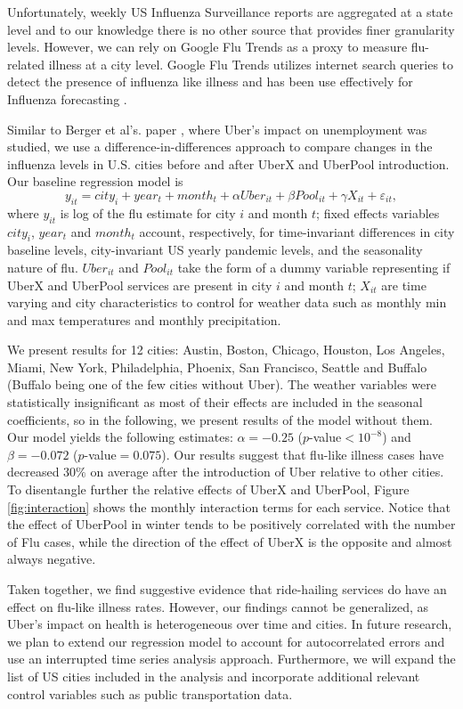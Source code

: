 \documentclass[a4paper,12pt]{article}
\begin{document}
Unfortunately, weekly US Influenza Surveillance reports are aggregated at a state level and to our knowledge there is no other source that provides finer granularity levels. However, we can rely on Google Flu Trends as a proxy to measure flu-related illness at a city level. Google Flu Trends utilizes internet search queries to detect the presence of influenza like illness and has been use effectively for Influenza forecasting \cite{yang2015accurate}.

Similar to Berger et al's. paper \cite{berger2017drivers}, where Uber's impact on unemployment was studied, we use a difference-in-differences approach to compare changes in the influenza levels in U.S. cities before and after UberX and UberPool introduction. Our baseline regression model is
\[
y_{it}=city_{i}+year_{t}+month_{t}+\alpha Uber_{it}+\beta Pool_{it}+\gamma X_{it}+ \varepsilon_{it},
\]
where $y_{it}$ is log of the flu estimate for city $i$ and month $t$; fixed effects variables $city_{i}$, $year_{t}$ and $month_{t}$ account, respectively, for time-invariant differences in city baseline levels, city-invariant US yearly pandemic levels, and the seasonality nature of flu. $Uber_{it}$ and $ Pool_{it}$ take the form of a dummy variable representing if UberX and UberPool services are present in city $i$ and month $t$; $X_{it}$ are time varying and city characteristics to control for weather data such as monthly min and max temperatures and monthly precipitation.

We present results for 12 cities: Austin, Boston, Chicago, Houston, Los Angeles, Miami, New York, Philadelphia, Phoenix,  San Francisco, Seattle and Buffalo (Buffalo being one of the few cities without Uber). The weather variables were statistically insignificant as most of their effects are included in the seasonal coefficients, so in the following, we present results of the model without them.
Our model yields the following estimates:  $\alpha =-0.25$ ($p$-value$<10^{-8}$) and $\beta =-0.072$ ($p$-value$=0.075$). Our results suggest that flu-like illness cases have decreased $30\%$ on average after the introduction of Uber relative to other cities. To disentangle further the relative effects of UberX and UberPool, Figure \ref{fig:interaction} shows the monthly interaction terms for each service. Notice  that the effect of UberPool in winter tends to be positively correlated with the number of Flu cases,  while the direction of the effect of UberX is the opposite and almost always negative.

Taken together, we find suggestive evidence that ride-hailing services do have an effect on flu-like illness rates. However, our findings cannot be generalized, as Uber's impact on health is heterogeneous over time and cities. In future research, we plan to extend our regression model to account for autocorrelated errors and use an interrupted time series analysis approach. Furthermore, we will expand the list of US cities included in the analysis and incorporate additional relevant control variables such as public transportation data.
\end{document}
